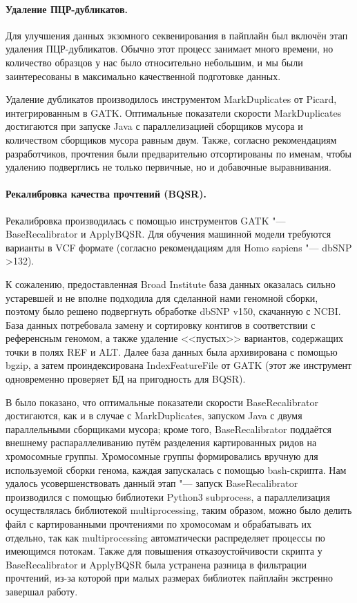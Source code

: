 \documentclass[a4paper,12pt]{article}
\begin{document}
\paragraph{Удаление ПЦР-дубликатов.}
Для улучшения данных экзомного секвенирования в пайплайн был включён этап удаления ПЦР-дубликатов.
Обычно этот процесс занимает много времени, но количество образцов у нас было относительно небольшим, и мы были заинтересованы в максимально качественной подготовке данных.

Удаление дубликатов производилось инструментом MarkDuplicates от Picard\cite{picard}, интегрированным в GATK.
Оптимальные показатели скорости MarkDuplicates достигаются при запуске Java с параллелизацией сборщиков мусора и количеством сборщиков мусора равным двум\cite{Heldenbrand_2019}.
Также, согласно рекомендациям разработчиков, прочтения были предварительно отсортированы по именам, чтобы удалению подверглись не только первичные, но и добавочные выравнивания\cite{Auwera_2013}.

\paragraph{Рекалибровка качества прочтений (BQSR).}
Рекалибровка производилась с помощью инструментов GATK "--- BaseRecalibrator и ApplyBQSR.
Для обучения машинной модели требуются варианты в VCF формате (согласно рекомендациям для Homo sapiens "--- dbSNP >132).

К сожалению, предоставленная Broad Institute база данных оказалась сильно устаревшей и не вполне подходила для сделанной нами геномной сборки, поэтому было решено подвергнуть обработке dbSNP v150, скачанную с NCBI\cite{Sherry_2001}.
База данных потребовала замену и сортировку контигов в соответствии с референсным геномом, а также удаление <<пустых>> вариантов, содержащих точки в полях REF и ALT.
Далее база данных была архивирована с помощью bgzip, а затем проиндексирована IndexFeatureFile от GATK (этот же инструмент одновременно проверяет БД на пригодность для BQSR).

В \cite{Heldenbrand_2019} было показано, что оптимальные показатели скорости BaseRecalibrator достигаются, как и в случае с MarkDuplicates, запуском Java с двумя параллельными сборщиками мусора;
кроме того, BaseRecalibrator поддаётся внешнему распараллеливанию путём разделения картированных ридов на хромосомные группы.
Хромосомные группы формировались вручную для используемой сборки генома, каждая запускалась с помощью bash-скрипта.
Нам удалось усовершенствовать данный этап "--- запуск BaseRecalibrator производился с помощью библиотеки Python3 subprocess, а параллелизация осуществлялась библиотекой multiprocessing, таким образом, можно было делить файл с картированными прочтениями по хромосомам и обрабатывать их отдельно, так как multiprocessing автоматически распределяет процессы по имеющимся потокам.
Также для повышения отказоустойчивости скрипта у BaseRecalibrator и ApplyBQSR была устранена разница в фильтрации прочтений, из-за которой при малых размерах библиотек пайплайн экстренно завершал работу.
\end{document}
